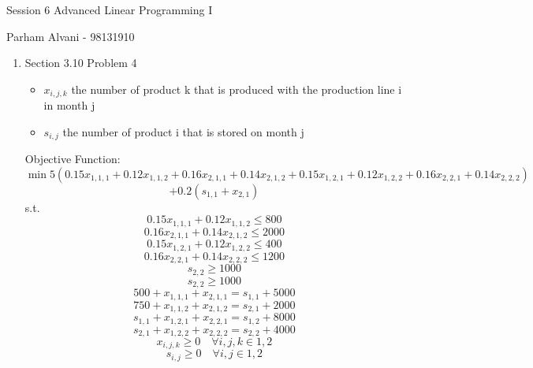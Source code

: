 \documentclass{article}
\begin{document}
\large %


{\Large Session 6 %
\hfill  Advanced Linear Programming I}

\begin{center}
{\Large Parham Alvani - 98131910} %
\end{center}
\vspace{0.05in}


\begin{enumerate}

\item Section 3.10 Problem 4
\begin{itemize}
    \item \(x_{i,j,k}\) the number of product k that is produced with the production line i in month j
    \item \(s_{i,j}\) the number of product i that is stored on month j
\end{itemize}
\par
Objective Function:
\[
    \min 5(0.15x_{1,1,1} + 0.12x_{1,1,2} + 0.16x_{2,1,1} + 0.14x_{2,1,2} + 0.15x_{1,2,1} + 0.12x_{1,2,2} + 0.16x_{2,2,1} + 0.14x_{2,2,2})
\]
\[
    + 0.2 (s_{1,1} + x_{2,1})
\]
s.t.
\[
    0.15 x_{1,1,1} + 0.12 x_{1,1,2} \le 800
\]
\[
    0.16 x_{2,1,1} + 0.14 x_{2,1,2} \le 2000
\]
\[
    0.15 x_{1,2,1} + 0.12 x_{1,2,2} \le 400
\]
\[
    0.16 x_{2,2,1} + 0.14 x_{2,2,2} \le 1200
\]
\[
    s_{2, 2} \ge 1000
\]
\[
    s_{2, 2} \ge 1000
\]
\[
    500 + x_{1,1,1} + x_{2,1,1} = s_{1,1} + 5000
\]
\[
    750 + x_{1,1,2} + x_{2,1,2} = s_{2,1} + 2000
\]
\[
    s_{1,1} + x_{1,2,1} + x_{2,2,1} = s_{1, 2} + 8000
\]
\[
    s_{2,1} + x_{1,2,2} + x_{2,2,2} = s_{2, 2} + 4000
\]
\[
    x_{i,j,k} \ge 0 \quad \forall i, j, k \in {1, 2}
\]
\[
    s_{i,j} \ge 0 \quad \forall i, j \in {1, 2}
\]

\end{enumerate}

\end{document}
